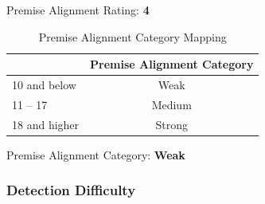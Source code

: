 \begin{fullwidth}
Premise Alignment Rating: \textbf{4}

\begin{table}[H]
\centering
\begin{tabular}{|l|c|}
\hline
\rowcolor[HTML]{96BEE6} 
\multicolumn{1}{|c|}{\cellcolor[HTML]{96BEE6}\textbf{Premise Alignment Rating}} & \textbf{Premise Alignment Category} \\ \hline
10 and below                                                                    & Weak                                \\ \hline
11 – 17                                                                         & Medium                              \\ \hline
18 and higher                                                                   & Strong                              \\ \hline
\end{tabular}
\captionsetup{justification=centering}
\caption{Premise Alignment Category Mapping}
\end{table}

Premise Alignment Category: \textbf{Weak}

\subsubsection{Detection Difficulty} %


\end{fullwidth}
